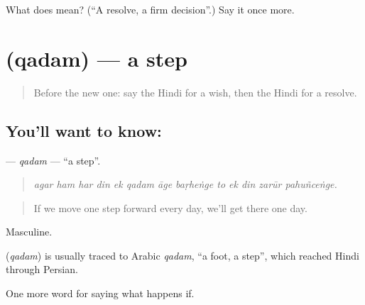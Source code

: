 \begin{tcolorbox}[breakable,colback=teal!4,colframe=teal!35!black,title={Before you move on}]
What does  mean? (\textquotedblleft{}A resolve, a firm decision\textquotedblright{}.) Say it once more.
\end{tcolorbox}
\section[\texorpdfstring{\hi{क़दम} (qadam)}{क़दम (qadam)}]{ (qadam) — a step}

\label{lesson:HI-C390-qadam}



\begin{quote}
Before the new one: say the Hindi for a wish, then the Hindi for a resolve.
\end{quote}

\subsection*{You'll want to know: }
\textbf{} — \emph{qadam} — \textquotedblleft{}a step\textquotedblright{}.

\begin{quote}
            
\end{quote}

\begin{quote}
\emph{agar ham har din ek qadam āge baṛheṅge to ek din zarūr pahuñceṅge.}
\end{quote}

\begin{quote}
If we move one step forward every day, we'll get there one day.
\end{quote}

Masculine.

\begin{cousinweb}
\textbf{} (\emph{qadam}) is usually traced to Arabic \emph{qadam}, \textquotedblleft{}a foot, a step\textquotedblright{}, which reached Hindi through Persian.
\end{cousinweb}

\begin{grammarlens}[title={What you've built}]
One more word for saying what happens if.
\end{grammarlens}

